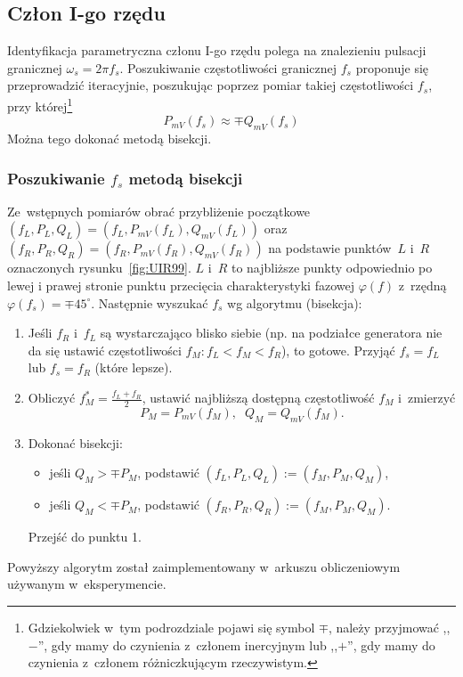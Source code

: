 \documentclass[paper=a4,DIV=12]{lpas}
\newcommand{\degree}{^{\circ}}
\begin{document}
\begin{appendices}
  \subsection{Człon I-go rzędu}
  \label{sec:4C7KI}

  Identyfikacja parametryczna członu I-go rzędu polega na znalezieniu pulsacji
  granicznej $\omega_s = 2 \pi f_s$. Poszukiwanie częstotliwości granicznej
  $f_s$ proponuje się przeprowadzić iteracyjnie, poszukując poprzez pomiar
  takiej częstotliwości $f_s$, przy której\footnote{Gdziekolwiek w~tym
  podrozdziale pojawi się symbol $\mp$, należy przyjmować ,,$-$'', gdy mamy do
  czynienia z~członem inercyjnym lub ,,$+$'', gdy mamy do czynienia z~członem
  różniczkującym rzeczywistym.}
  \begin{equation}
    P_{mV}(f_s) \approx \mp Q_{mV}(f_s)
    \label{eq:7M2JN}
  \end{equation}
  Można tego dokonać metodą bisekcji.

  \subsubsection{Poszukiwanie $f_s$ metodą bisekcji}
  \label{sec:L0JNW}

  Ze~wstępnych pomiarów obrać przybliżenie początkowe
  $(f_L, P_L, Q_L) = (f_L, P_{mV}(f_L), Q_{mV}(f_L))$
  oraz $(f_R, P_R, Q_R) = (f_R, P_{mV}(f_R), Q_{mV}(f_R))$
  na podstawie punktów~$L$ i~$R$ oznaczonych rysunku~\ref{fig:UIR99}. $L$ i~$R$
  to najbliższe punkty odpowiednio po lewej i prawej stronie punktu przecięcia
  charakterystyki fazowej $\varphi(f)$ z~rzędną $\varphi(f_s) = \mp 45\degree$.
  Następnie wyszukać $f_s$ wg algorytmu (bisekcja):

  \begin{enumerate}
    \item Jeśli $f_R$ i~$f_L$ są wystarczająco blisko siebie (np. na podziałce
      generatora nie da się ustawić częstotliwości $f_M: f_L < f_M < f_R$), to
      gotowe. Przyjąć $f_s = f_L$ lub $f_s = f_R$ (które lepsze).
    \item Obliczyć $f_M^{*} = \frac{f_L + f_R}{2}$, ustawić najbliższą dostępną
      częstotliwość $f_M$ i~zmierzyć \[P_M = P_{mV}(f_M),\;\; Q_M = Q_{mV}(f_M).\]
    \item Dokonać bisekcji:
      \begin{itemize}
        \item jeśli $Q_M > \mp P_M$, podstawić $(f_L, P_L, Q_L) := (f_M, P_M, Q_M)$,
        \item jeśli $Q_M < \mp P_M$, podstawić $(f_R, P_R, Q_R) := (f_M, P_M, Q_M)$.
      \end{itemize}
      Przejść do punktu 1.
  \end{enumerate}
  Powyższy algorytm został zaimplementowany w~arkuszu obliczeniowym używanym
  w~eksperymencie.


\end{appendices}
\end{document}
